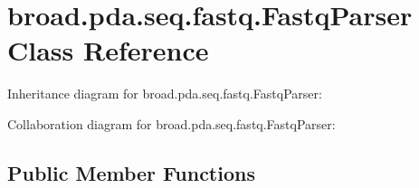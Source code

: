\hypertarget{classbroad_1_1pda_1_1seq_1_1fastq_1_1_fastq_parser}{\section{broad.\+pda.\+seq.\+fastq.\+Fastq\+Parser Class Reference}
\label{classbroad_1_1pda_1_1seq_1_1fastq_1_1_fastq_parser}
}


Inheritance diagram for broad.\+pda.\+seq.\+fastq.\+Fastq\+Parser\+:


Collaboration diagram for broad.\+pda.\+seq.\+fastq.\+Fastq\+Parser\+:
\subsection*{Public Member Functions}
